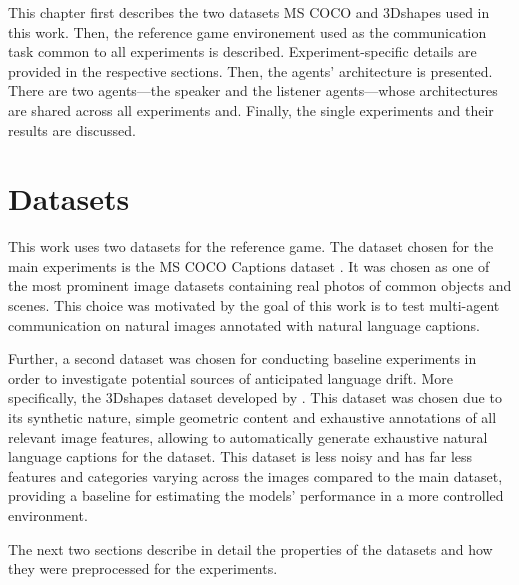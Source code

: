 This chapter first describes the two datasets MS COCO and 3Dshapes used in this work. Then, the reference game environement used as the communication task common to all experiments is described. Experiment-specific details are provided in the respective sections.  Then, the agents' architecture is presented. There are two agents---the speaker and the listener agents---whose architectures are shared across all experiments and. Finally, the single experiments and their results are discussed.

\section{Datasets}

This work uses two datasets for the reference game. The dataset chosen for the main experiments is the MS COCO Captions dataset \parencite{chen2015microsoft}. It was chosen as one of the most prominent image datasets containing real photos of common objects and scenes. This choice was motivated by the goal of this work is to test multi-agent communication on natural images annotated with natural language captions. 

Further, a second dataset was chosen for conducting baseline experiments in order to investigate potential sources of anticipated language drift. More specifically, the 3Dshapes dataset developed by \parencite{burgess20183d}. This dataset was chosen due to its synthetic nature, simple geometric content and exhaustive annotations of all relevant image features, allowing to automatically generate exhaustive natural language captions for the dataset. This dataset is less noisy and has far less features and categories varying across the images compared to the main dataset, providing a baseline for estimating the models' performance in a more controlled environment.

The next two sections describe in detail the properties of the datasets and how they were preprocessed for the experiments.

